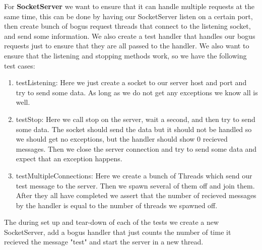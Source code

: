\documentclass{article}
\begin{document}
For \textbf{SocketServer} we want to ensure that it can handle multiple requests at the same time, this can be done by
having our SocketServer listen on a certain port, then create bunch of bogus request threads that connect to the
listening socket, and send some information. We also create a test handler that handles our bogus requests just to
ensure that they are all passed to the handler. We also want to ensure that the listening and stopping methods work, so
we have the following test cases:
\begin{enumerate}
\item testListening: Here we just create a socket to our server host and port and try to send some data. As long as we
do not get any exceptions we know all is well.
\item testStop: Here we call stop on the server, wait a second, and then try to send some data. The socket should send
the data but it should not be handled so we should get no exceptions, but the handler should show 0 recieved messages.
Then we close the server connection and try to send some data and expect that an exception happens.
\item testMultipleConnections: Here we create a bunch of Threads which send our test message to the server. Then we
spawn several of them off and join them. After they all have completed we assert that the number of recieved messages
by the handler is equal to the number of threads we spawned off.
\end{enumerate}
The during set up and tear-down of each of the tests we create a new SocketServer, add a bogus handler that just counts
the number of time it recieved the message "test" and start the server in a new thread.
\end{document}
